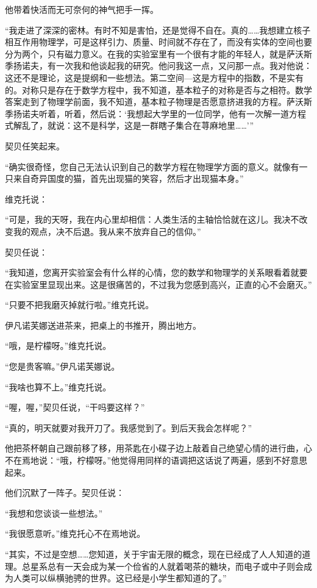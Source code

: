 他带着快活而无可奈何的神气把手一挥。

“我走进了深深的密林。有时不知是害怕，还是觉得不自在。真的……我想建立核子相互作用物理学，可是这样引力、质量、时间就不存在了，而没有实体的空间也要分为两个，只有磁力意义。在我的实验室里有一个很有才能的年轻人，就是萨沃斯季扬诺夫，有一次我和他谈起我的研究。他问我这一点，又问那一点。我对他说：这还不是理论，这是提纲和一些想法。第二空间—这是方程中的指数，不是实有的。对称只是存在于数学方程中，我不知道，基本粒子的对称是否与之相符。数学答案走到了物理学前面，我不知道，基本粒子物理是否愿意挤进我的方程。萨沃斯季扬诺夫听着，听着，然后说：‘我想起大学里的一位同学，他有一次解一道方程式解乱了，就说：这不是科学，这是一群瞎子集合在荨麻地里……’”

契贝任笑起来。

“确实很奇怪，您自己无法认识到自己的数学方程在物理学方面的意义。就像有一只来自奇异国度的猫，首先出现猫的笑容，然后才出现猫本身。”

维克托说：

“可是，我的天呀，我在内心里却相信：人类生活的主轴恰恰就在这儿。我决不改变我的观点，决不后退。我从来不放弃自己的信仰。”

契贝任说：

“我知道，您离开实验室会有什么样的心情，您的数学和物理学的关系眼看着就要在实验室里显现出来。这是很痛苦的，不过我为您感到高兴，正直的心不会磨灭。”

“只要不把我磨灭掉就行啦。”维克托说。

伊凡诺芙娜送进茶来，把桌上的书推开，腾出地方。

“哦，是柠檬呀。”维克托说。

“您是贵客嘛。”伊凡诺芙娜说。

“我啥也算不上。”维克托说。

“喔，喔，”契贝任说，“干吗要这样？”

“真的，明天就要对我开刀了。我感觉到了。到后天我会怎样呢？”

他把茶杯朝自己跟前移了移，用茶匙在小碟子边上敲着自己绝望心情的进行曲，心不在焉地说：“哦，柠檬呀。”他觉得用同样的语调把这话说了两遍，感到不好意思起来。

他们沉默了一阵子。契贝任说：

“我想和您谈谈一些想法。”

“我很愿意听。”维克托心不在焉地说。

“其实，不过是空想……您知道，关于宇宙无限的概念，现在已经成了人人知道的道理。总星系总有一天会成为某一个俭省的人就着喝茶的糖块，而电子或中子则会成为人类可以纵横驰骋的世界。这已经是小学生都知道的了。”

